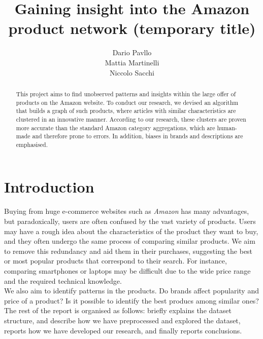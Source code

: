 \documentclass[11pt]{article}
\title{Gaining insight into the Amazon product network (temporary title)}
\author{Dario Pavllo  \\\And
  Mattia Martinelli  \\\And
Niccolo Sacchi \\}
\date{}
\begin{document}
\maketitle
\begin{abstract}
This project aims to find unobserved patterns and insights within the large offer of products on the Amazon website. To conduct our research, we devised an algorithm that builds a graph of such products, where articles with similar characteristics are clustered in an innovative manner. According to our research, these clusters are proven more accurate than the standard Amazon category aggregations, which are human-made and therefore prone to errors. In addition, biases in brands and descriptions are emphasised.

\end{abstract}

\section{Introduction}
Buying from huge e-commerce websites such as \emph{Amazon} has many advantages, but paradoxically, users are often confused by the vast variety of products. Users may have a rough idea about the characteristics of the product they want to buy, and they often undergo the same process of comparing similar products. We aim to remove this redundancy and aid them in their purchases, suggesting the best or most popular products that correspond to their search. For instance, comparing smartphones or laptops may be difficult due to the wide price range and the required technical knowledge. \\ 
We also aim to identify patterns in the products. Do brands affect popularity and price of a product? Is it possible to identify the best producs among similar ones? 
The rest of the report is organised as follows:  briefly explains the dataset structure,  and  describe how we have preprocessed and explored the dataset,  reports how we have developed our research, and finally  reports conclusions.
\end{document}
